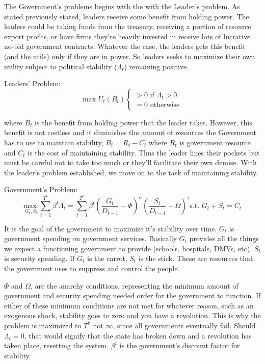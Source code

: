 \documentclass[12pt]{article}
\begin{document}
\begin{spacing}{1.5}
The Government's problems begins with the with the Leader's problem. As stated previously stated, leaders receive some benefit from holding power. The leaders could be taking funds from the treasury, receiving a portion of resource export profits, or have firms they're heavily invested in receive lots of lucrative no-bid government contracts. Whatever the case, the leaders gets this benefit (and the utils) only if they are in power. So leaders seeks to maximize their own utility subject to political stability ($\Lambda_t$) remaining positive.

\vspace{.5 em}
\noindent Leaders' Problem:
\begin{equation}
	 \text{max } U_t(B_t) \begin{cases}
		>0 \text{ if } \Lambda_t > 0 \\
		= 0 \text{ otherwise} 	
	\end{cases}
\end{equation} 

\noindent where $B_t$ is the benefit from holding power that the leader takes. However, this benefit is not costless and it diminishes the amount of resources the Government has to use to maintain stability, $B_t=R_t-C_t$ where $R_t$ is government resource and $C_t$ is the cost of maintaining stability. Thus the leader lines their pockets but must be careful not to take too much or they'll facilitate their own demise. With the leader's problem established, we move on to the task of maintaining stability.   
\vspace{.5 em}

\noindent Government's Problem:
\begin{equation}
{\underset{G_t,S_t}{\text{max }}} \sum\limits_{t=1}^{T^*} \beta^t {\Lambda}_t = \sum\limits_{t=1}^{T^*} \beta^t\left(\frac{G_t}{D_{t-1}}-\Phi\right)^\alpha \left(\frac{S_t}{D_{t-1}}-\Omega\right)^\gamma   \text{s.t. } G_t+S_t=C_t
\end{equation}

It is the goal of the government to maximize it's stability over time. $G_t$ is government spending on government services. Basically $G_t$ provides all the things we expect a functioning government to provide (schools, hospitals, DMVs, etc). $S_t$ is security spending. If $G_t$ is the carrot, $S_t$ is the stick. These are resources that the government uses to suppress and control the people. 

$\Phi$ and $\Omega$, are the anarchy conditions, representing the minimum amount of government and security spending needed order for the government to function. If either of these minimum conditions are not met for whatever reason, such as an exogenous shock, stability goes to zero and you have a revolution. This is why the problem is maximized to $T^*$ not $\infty$, since all governments eventually fail. Should $\Lambda_t=0$, that would signify that the state has broken down and a revolution has taken place, resetting the system. $\beta^t$ is the government's discount factor for stability. 


\end{spacing}
\end{document}
